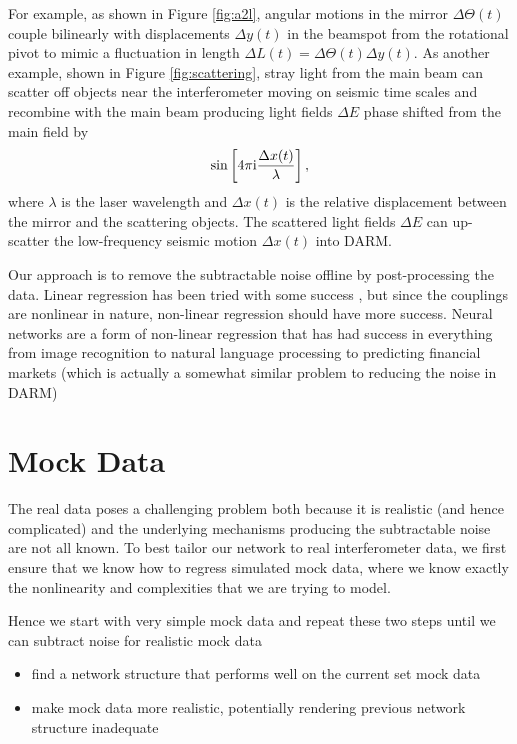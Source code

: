 \begin{refsection}

For example, as shown in Figure 
\ref{fig:a2l}, 
angular motions in the mirror $\Delta \Theta (t)$ couple bilinearly with displacements $\Delta y (t)$ in the beamspot from the rotational pivot to mimic a fluctuation in length $\Delta L (t)=\Delta\Theta(t) \Delta y(t)$. As another example, shown in 
Figure \ref{fig:scattering}, 
stray light from the main beam can scatter off objects near the interferometer moving on seismic time scales and recombine with the main beam producing light fields $\Delta E$ phase shifted from the main field by 
\begin{equation}
\sin \left[4\pi {\rm i}\frac{\Delta x(t)}{\lambda} \right],
\end{equation}
where $\lambda$ is the laser wavelength and $\Delta x(t)$ is the relative displacement between the mirror and the scattering objects. The scattered light fields $\Delta E$ can up-scatter the low-frequency seismic motion $\Delta x(t)$ into DARM. 

Our approach is to remove the subtractable noise offline by post-processing the data. Linear regression has been tried with some success \cite{lin_reg}, but since the couplings are nonlinear in nature, non-linear regression should have more success. Neural networks are a form of non-linear regression that has had success in everything from image recognition \cite{10.1007/978-981-15-3020-3_23} to natural language processing \cite{FATHI2018229} to predicting financial markets \cite{siaminamini2018forecasting} (which is actually a somewhat similar problem to reducing the noise in DARM)

\section{Mock Data}

The real data poses a challenging problem both because it is realistic (and hence complicated) and the underlying mechanisms producing the subtractable noise are not all known. To best tailor our network to real interferometer data, we first ensure that we know how to regress simulated mock data, where we know exactly the nonlinearity and complexities that we are trying to model. 

Hence we start with very simple mock data and repeat these two steps until we can subtract noise for realistic mock data
\begin{itemize}
\item find a network structure that performs well on the current set mock data
\item make mock data more realistic, potentially rendering previous network structure inadequate
\end{itemize}


\end{refsection}
